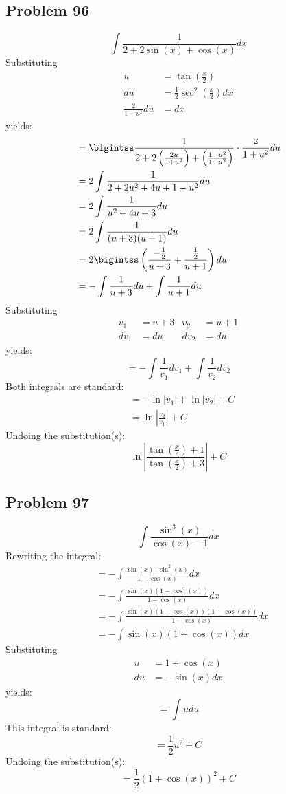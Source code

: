 \documentclass{article}
\begin{document}
\subsection*{Problem 96}
$$\int\frac{1}{2+2\sin\left(x\right)+\cos\left(x\right)}dx$$
Substituting
\begin{align*}
u&=\tan\left(\frac{x}{2}\right) \\
du&=\frac{1}{2}\sec^2\left(\frac{x}{2}\right)dx \\
\frac{2}{1+u^2}du&=dx
\end{align*}
yields:
\begin{align*}
&=\bigintss\frac{1}{2+2\left(\frac{2u}{1+u^2}\right)+\left(\frac{1-u^2}{1+u^2}\right)}\cdot\frac{2}{1+u^2}du \\
&=2\int\frac{1}{2+2u^2+4u+1-u^2}du \\
&=2\int\frac{1}{u^2+4u+3}du \\
&=2\int\frac{1}{(u+3)(u+1)}du \\
&=2\bigintss\left(\frac{-\frac{1}{2}}{u+3}+\frac{\frac{1}{2}}{u+1}\right)du \\
&=-\int\frac{1}{u+3}du+\int\frac{1}{u+1}du
\end{align*}
Substituting
\begin{align*}
v_1&=u+3 &v_2&=u+1 \\
dv_1&=du &dv_2&=du
\end{align*}
yields:
$$=-\int\frac{1}{v_1}dv_1+\int\frac{1}{v_2}dv_2$$
Both integrals are standard:
\begin{align*}
&=-\ln|v_1|+\ln|v_2|+C \\
&=\ln\left|\frac{v_2}{v_1}\right|+C
\end{align*}
Undoing the substitution(s):
$$\ln\left|\frac{\tan\left(\frac{x}{2}\right)+1}{\tan\left(\frac{x}{2}\right)+3}\right|+C$$
\subsection*{Problem 97}
$$\int\frac{\sin^3\left(x\right)}{\cos\left(x\right)-1}dx$$
Rewriting the integral:
\begin{align*}
&=-\int\frac{\sin(x)\cdot\sin^2(x)}{1-\cos(x)}dx \\
&=-\int\frac{\sin(x)(1-\cos^2(x))}{1-\cos(x)}dx \\
&=-\int\frac{\sin(x)(1-\cos(x))(1+\cos(x))}{1-\cos(x)}dx \\
&=-\int\sin(x)(1+\cos(x))dx
\end{align*}
Substituting
\begin{align*}
u&=1+\cos(x)\\
du&=-\sin(x)dx
\end{align*}
yields:
$$=\int udu$$
This integral is standard:
$$=\frac{1}{2}u^2+C$$
Undoing the substitution(s):
$$=\frac{1}{2}(1+\cos(x))^2+C$$
\end{document}
